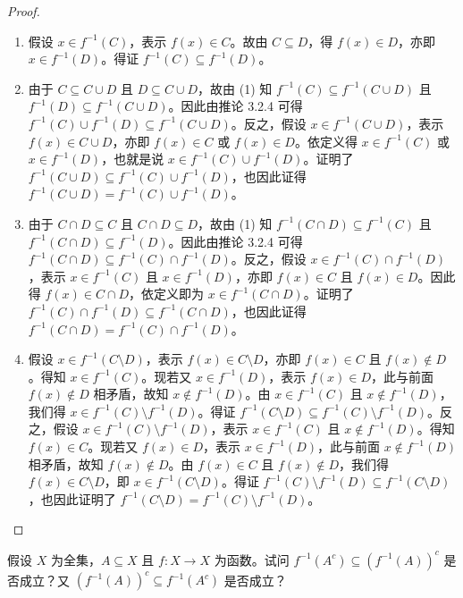 \begin{proof}
\begin{enumerate}
    \item 假设 $x \in f^{-1}(C)$，表示 $f(x) \in C$。故由 $C \subseteq D$，得 $f(x) \in D$，亦即 $x \in f^{-1}(D)$。得证 $f^{-1}(C) \subseteq f^{-1}(D)$。
    \item 由于 $C \subseteq C \cup D$ 且 $D \subseteq C \cup D$，故由 (1) 知 $f^{-1}(C) \subseteq f^{-1}(C \cup D)$ 且 $f^{-1}(D) \subseteq f^{-1}(C \cup D)$。因此由推论 3.2.4 可得 $f^{-1}(C) \cup f^{-1}(D) \subseteq f^{-1}(C \cup D)$。反之，假设 $x \in f^{-1}(C \cup D)$，表示 $f(x) \in C \cup D$，亦即 $f(x) \in C$ 或 $f(x) \in D$。依定义得 $x \in f^{-1}(C)$ 或 $x \in f^{-1}(D)$，也就是说 $x \in f^{-1}(C) \cup f^{-1}(D)$。证明了 $f^{-1}(C \cup D) \subseteq f^{-1}(C) \cup f^{-1}(D)$，也因此证得 $f^{-1}(C \cup D) = f^{-1}(C) \cup f^{-1}(D)$。
    \item 由于 $C \cap D \subseteq C$ 且 $C \cap D \subseteq D$，故由 (1) 知 $f^{-1}(C \cap D) \subseteq f^{-1}(C)$ 且 $f^{-1}(C \cap D) \subseteq f^{-1}(D)$。因此由推论 3.2.4 可得 $f^{-1}(C \cap D) \subseteq f^{-1}(C) \cap f^{-1}(D)$。反之，假设 $x \in f^{-1}(C) \cap f^{-1}(D)$，表示 $x \in f^{-1}(C)$ 且 $x \in f^{-1}(D)$，亦即 $f(x) \in C$ 且 $f(x) \in D$。因此得 $f(x) \in C \cap D$，依定义即为 $x \in f^{-1}(C \cap D)$。证明了 $f^{-1}(C) \cap f^{-1}(D) \subseteq f^{-1}(C \cap D)$，也因此证得 $f^{-1}(C \cap D) = f^{-1}(C) \cap f^{-1}(D)$。
    \item 假设 $x \in f^{-1}(C \setminus D)$，表示 $f(x) \in C \setminus D$，亦即 $f(x) \in C$ 且 $f(x) \notin D$。得知 $x \in f^{-1}(C)$。现若又 $x \in f^{-1}(D)$，表示 $f(x) \in D$，此与前面 $f(x) \notin D$ 相矛盾，故知 $x \notin f^{-1}(D)$。由 $x \in f^{-1}(C)$ 且 $x \notin f^{-1}(D)$，我们得 $x \in f^{-1}(C) \setminus f^{-1}(D)$。得证 $f^{-1}(C \setminus D) \subseteq f^{-1}(C) \setminus f^{-1}(D)$。反之，假设 $x \in f^{-1}(C) \setminus f^{-1}(D)$，表示 $x \in f^{-1}(C)$ 且 $x \notin f^{-1}(D)$。得知 $f(x) \in C$。现若又 $f(x) \in D$，表示 $x \in f^{-1}(D)$，此与前面 $x \notin f^{-1}(D)$ 相矛盾，故知 $f(x) \notin D$。由 $f(x) \in C$ 且 $f(x) \notin D$，我们得 $f(x) \in C \setminus D$，即 $x \in f^{-1}(C \setminus D)$。得证 $f^{-1}(C) \setminus f^{-1}(D) \subseteq f^{-1}(C \setminus D)$，也因此证明了 $f^{-1}(C \setminus D) = f^{-1}(C) \setminus f^{-1}(D)$。
\end{enumerate}
\end{proof}

\begin{question}
假设 $X$ 为全集，$A \subseteq X$ 且 $f : X \to X$ 为函数。试问 $f^{-1}(A^c) \subseteq (f^{-1}(A))^c$ 是否成立？又 $(f^{-1}(A))^c \subseteq f^{-1}(A^c)$ 是否成立？
\end{question}

